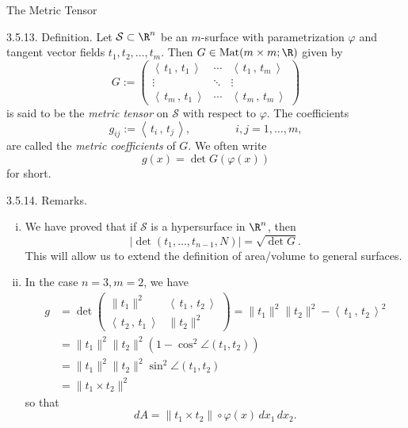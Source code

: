 \documentclass[smaller,hyperref={CJKbookmarks=true}]{beamer}
\newcommand{\myseries}[2]{$#1_1,#1_2,\dots,#1_#2$}
\newcommand{\scp}[2]{\left\langle\,#1\,,\,#2\,\right\rangle} \newcommand{\scpp}{\langle\,\cdot\,,\,\cdot\,\rangle}
\begin{document}
\begin{frame}{The Metric Tensor}
\begin{spacing}{1}
\alert{3.5.13. Definition.} Let $\mathcal{S}\subset\R^n$ be an $m$-surface with parametrization $\varphi$ and tangent vector fields \myseries{t}{m}. Then $G\in\text{Mat}(m\times m;\R)$ given by
\[G:=\begin{pmatrix}
       \scp{t_1}{t_1} & \cdots & \scp{t_1}{t_m} \\
       \vdots & \ddots & \vdots \\
       \scp{t_m}{t_1} & \cdots & \scp{t_m}{t_m}
     \end{pmatrix}\]
is said to be the \emph{metric tensor} on $\mathcal{S}$ with respect to $\varphi$. The coef{}ficients
\[g_{ij}:=\scp{t_i}{t_j},\qquad\qquad
i,j=1,\ldots,m,\]
are called the \emph{metric coef{}ficients} of $G$. We often write
\[g(x)=\det G(\varphi(x))\]
for short.
\end{spacing}
\newpage
\begin{spacing}{0.9}
\alert{3.5.14. Remarks.}
\begin{enumerate}[(i)]
  \item We have proved that if $\mathcal{S}$ is a hypersurface in $\R^n$, then
      \[|\det(t_1,\ldots,t_{n-1},N)|=\sqrt{\det G}.\]
      This will allow us to extend the definition of area/volume to general
surfaces.
  \item In the case $n=3,m=2$, we have
      \begin{equation*}
        \begin{split}
           g &=\det\begin{pmatrix}
                     \|t_1\|^2 & \scp{t_1}{t_2} \\
                     \scp{t_2}{t_1} & \|t_2\|^2
                   \end{pmatrix}=\|t_1\|^2\|t_2\|^2-
                   \scp{t_1}{t_2}^2  \\
             &=\|t_1\|^2\|t_2\|^2\left(1-\cos^2\angle(t_1,t_2)\right)  \\
             &=\|t_1\|^2\|t_2\|^2\sin^2\angle(t_1,t_2)  \\
             &=\|t_1\times t_2\|^2
        \end{split}
      \end{equation*}
      so that
      \[dA=\|t_1\times t_2\|\circ\varphi(x)\,dx_1\,dx_2.\]
\end{enumerate}
\end{spacing}
\end{frame}
\end{document}

